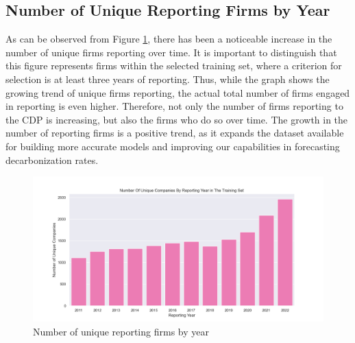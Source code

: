 

\subsection{Number of Unique Reporting Firms by Year}
As can be observed from Figure \ref{fig:unique-companies-by-year}, there has been a noticeable increase in the number of unique firms reporting over time. It is important to distinguish that this figure represents firms within the selected training set, where a criterion for selection is at least three years of reporting. Thus, while the graph shows the growing trend of unique firms reporting, the actual total number of firms engaged in reporting is even higher. Therefore, not only the number of firms reporting to the CDP is increasing, but also the firms who do so over time. The growth in the number of reporting firms is a positive trend, as it expands the dataset available for building more accurate models and improving our capabilities in forecasting decarbonization rates.


\begin{figure}[H]
  \begin{center}
  \includegraphics[width=5in]{figures/unique_companies.png}
  \caption{Number of unique reporting firms by year}
  \label{fig:unique-companies-by-year}
  \end{center}
\end{figure}

